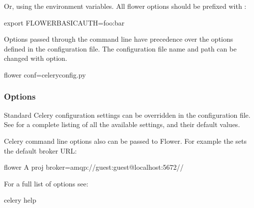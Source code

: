 \documentclass[letterpaper,10pt,english]{sphinxmanual}
\begin{document}
Or, using the environment variables. All flower options should be
prefixed with :

\begin{sphinxVerbatim}[commandchars=\\\{\}]
\PYGZdl{} export FLOWER\PYGZus{}BASIC\PYGZus{}AUTH=foo:bar
\end{sphinxVerbatim}

Options passed through the command line have precedence over the options
defined in the configuration file. The configuration file name and path
can be changed with {\hyperref[\detokenize{config:conf}]{}} option.

\begin{sphinxVerbatim}[commandchars=\\\{\}]
\PYGZdl{} flower \PYGZhy{}\PYGZhy{}conf=celeryconfig.py
\end{sphinxVerbatim}


\subsubsection{Options}
\label{\detokenize{config:options}}
Standard Celery configuration settings can be overridden in the configuration
file. See  for a complete listing of all
the available settings, and their default values.

Celery command line options also can be passed to Flower. For example
the  sets the default broker URL:

\begin{sphinxVerbatim}[commandchars=\\\{\}]
\PYGZdl{} flower \PYGZhy{}A proj \PYGZhy{}\PYGZhy{}broker=amqp://guest:guest@localhost:5672//
\end{sphinxVerbatim}

For a full list of options see:

\begin{sphinxVerbatim}[commandchars=\\\{\}]
\PYGZdl{} celery \PYGZhy{}\PYGZhy{}help
\end{sphinxVerbatim}
\end{document}
